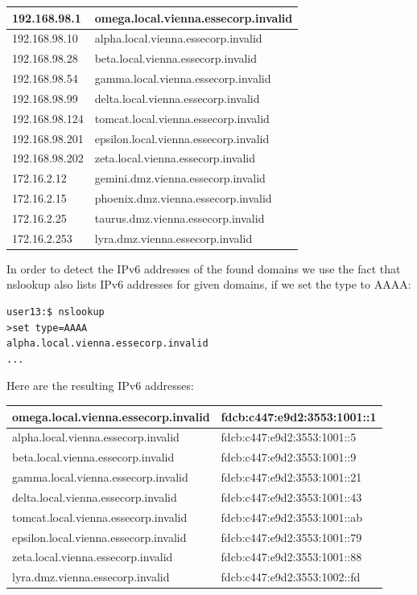 \documentclass[12pt,a4paper,titlepage,oneside]{scrartcl}
\begin{document}
\begin{tabular}{| l | l |}
\hline
192.168.98.1 & omega.local.vienna.essecorp.invalid \\ \hline
192.168.98.10 & alpha.local.vienna.essecorp.invalid \\ \hline
192.168.98.28 & beta.local.vienna.essecorp.invalid \\ \hline
192.168.98.54 & gamma.local.vienna.essecorp.invalid \\ \hline
192.168.98.99 & delta.local.vienna.essecorp.invalid \\ \hline
192.168.98.124 & tomcat.local.vienna.essecorp.invalid \\ \hline
192.168.98.201 & epsilon.local.vienna.essecorp.invalid \\ \hline
192.168.98.202 & zeta.local.vienna.essecorp.invalid \\ \hline
172.16.2.12 & gemini.dmz.vienna.essecorp.invalid \\ \hline
172.16.2.15 & phoenix.dmz.vienna.essecorp.invalid \\ \hline
172.16.2.25 & taurus.dmz.vienna.essecorp.invalid \\ \hline
172.16.2.253 & lyra.dmz.vienna.essecorp.invalid \\ \hline
\end{tabular}

In order to detect the IPv6 addresses of the found domains we use the fact that nslookup also lists IPv6 addresses for given domains, if we set the type to AAAA:

\begin{lstlisting}[style=simple]
user13:$ nslookup 
>set type=AAAA
alpha.local.vienna.essecorp.invalid
...
\end{lstlisting}

Here are the resulting IPv6 addresses:

\begin{tabular}{| l | l |}
\hline
omega.local.vienna.essecorp.invalid & fdcb:c447:e9d2:3553:1001::1 \\ \hline
alpha.local.vienna.essecorp.invalid & fdcb:c447:e9d2:3553:1001::5 \\ \hline
beta.local.vienna.essecorp.invalid & fdcb:c447:e9d2:3553:1001::9 \\ \hline
gamma.local.vienna.essecorp.invalid & fdcb:c447:e9d2:3553:1001::21 \\ \hline
delta.local.vienna.essecorp.invalid & fdcb:c447:e9d2:3553:1001::43 \\ \hline
tomcat.local.vienna.essecorp.invalid & fdcb:c447:e9d2:3553:1001::ab \\ \hline
epsilon.local.vienna.essecorp.invalid & fdcb:c447:e9d2:3553:1001::79 \\ \hline
zeta.local.vienna.essecorp.invalid & fdcb:c447:e9d2:3553:1001::88 \\ \hline
lyra.dmz.vienna.essecorp.invalid & fdcb:c447:e9d2:3553:1002::fd \\ \hline
\end{tabular}
\end{document}
